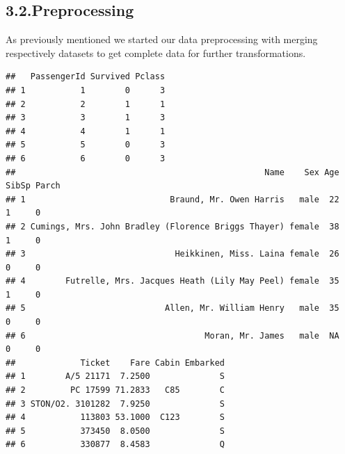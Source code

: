 \documentclass[
]{article}
\begin{document}
\hypertarget{preprocessing}{%
\subsection{3.2.Preprocessing}\label{preprocessing}}

As previously mentioned we started our data preprocessing with merging
respectively datasets to get complete data for further transformations.

\begin{verbatim}
##   PassengerId Survived Pclass
## 1           1        0      3
## 2           2        1      1
## 3           3        1      3
## 4           4        1      1
## 5           5        0      3
## 6           6        0      3
##                                                  Name    Sex Age SibSp Parch
## 1                             Braund, Mr. Owen Harris   male  22     1     0
## 2 Cumings, Mrs. John Bradley (Florence Briggs Thayer) female  38     1     0
## 3                              Heikkinen, Miss. Laina female  26     0     0
## 4        Futrelle, Mrs. Jacques Heath (Lily May Peel) female  35     1     0
## 5                            Allen, Mr. William Henry   male  35     0     0
## 6                                    Moran, Mr. James   male  NA     0     0
##             Ticket    Fare Cabin Embarked
## 1        A/5 21171  7.2500              S
## 2         PC 17599 71.2833   C85        C
## 3 STON/O2. 3101282  7.9250              S
## 4           113803 53.1000  C123        S
## 5           373450  8.0500              S
## 6           330877  8.4583              Q
\end{verbatim}
\end{document}

